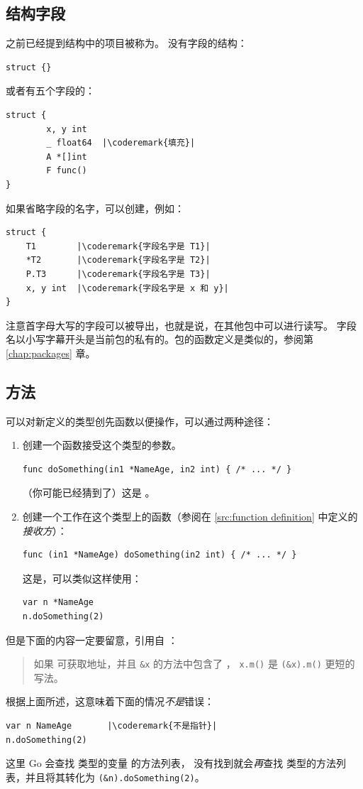 \subsection{结构字段}
之前已经提到结构中的项目被称为。
没有字段的结构：
\begin{lstlisting}
struct {}
\end{lstlisting}
或者有五个字段的：
\begin{lstlisting}
struct {
        x, y int
        _ float64  |\coderemark{填充}|
        A *[]int
        F func()
}
\end{lstlisting}
如果省略字段的名字，可以创建，例如：
\begin{lstlisting}
struct {
    T1        |\coderemark{字段名字是 T1}|
    *T2       |\coderemark{字段名字是 T2}|
    P.T3      |\coderemark{字段名字是 T3}|
    x, y int  |\coderemark{字段名字是 x 和 y}|
}
\end{lstlisting}
注意首字母大写的字段可以被导出，也就是说，在其他包中可以进行读写。
字段名以小写字幕开头是当前包的私有的。包的函数定义是类似的，参阅第 \ref{chap:packages} 章。

\subsection{方法}
\label{sec:methods}
可以对新定义的类型创先函数以便操作，可以通过两种途径：
\begin{enumerate}
\item 创建一个函数接受这个类型的参数。
\begin{lstlisting}
func doSomething(in1 *NameAge, in2 int) { /* ... */ }
\end{lstlisting}
（你可能已经猜到了）这是 。
\item 创建一个工作在这个类型上的函数（参阅在 \ref{src:function definition}
中定义的\emph{接收方}）：
\begin{lstlisting}
func (in1 *NameAge) doSomething(in2 int) { /* ... */ }
\end{lstlisting}
这是，可以类似这样使用：
\begin{lstlisting}
var n *NameAge
n.doSomething(2)
\end{lstlisting}
\end{enumerate}
但是下面的内容一定要留意，引用自 \cite{go_spec}：
\begin{quote}
如果  可获取地址，并且 \lstinline{&x} 的方法中包含了 ，
\lstinline{x.m()} 是 \lstinline{(&x).m()} 更短的写法。
\end{quote}
根据上面所述，这意味着下面的情况\emph{不是}错误：
\begin{lstlisting}
var n NameAge	    |\coderemark{不是指针}|
n.doSomething(2)    
\end{lstlisting}
这里 Go 会查找  类型的变量  的方法列表，
没有找到就会\emph{再}查找  类型的方法列表，并且将其转化为
\lstinline{(&n).doSomething(2)}。

